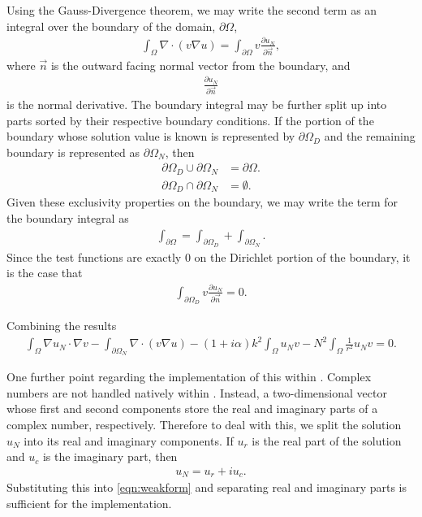 Using the Gauss-Divergence theorem, we may write the second term as an integral over the boundary of the domain, $\partial \Omega$,
\begin{align}
	\int_\Omega \nabla \cdot (v \nabla u ) = \int_{\partial\Omega} v \frac{\partial u_N}{\partial \vec{n}},
\end{align}
where $\vec{n}$ is the outward facing normal vector from the boundary, and
\begin{align}
	\frac{\partial u_N}{\partial \vec{n}} 
\end{align}
is the normal derivative.
The boundary integral may be further split up into parts sorted by their respective boundary conditions.
If the portion of the boundary whose solution value is known is represented by $\partial \Omega_D$ and the remaining boundary is represented as $\partial \Omega_N$, then
\begin{subequations}
\begin{align}
	\partial \Omega_D \cup \partial \Omega_N &= \partial \Omega. \\
	\partial \Omega_D \cap \partial \Omega_N &= \emptyset.
\end{align}
\end{subequations}
Given these exclusivity properties on the boundary, we may write the term for the boundary integral as
\begin{align}
	\int_{\partial\Omega} = \int_{\partial\Omega_D} + \int_{\partial\Omega_N}.
\end{align}
Since the test functions are exactly 0 on the Dirichlet portion of the boundary, it is the case that
\begin{align}
	\int_{\partial\Omega_D} v \frac{\partial u_N}{\partial \vec{n}} = 0.
\end{align}

Combining the results
\begin{align}
	\int_\Omega \nabla u_N \cdot \nabla v 
  - \int_{\partial\Omega_N} \nabla \cdot (v \nabla u ) 
  - (1+i\alpha)k^2 \int_\Omega u_N v 
  - N^2 \int_\Omega \frac{1}{r^2} u_N v = 0. \label{eqn:weakform}
\end{align}


One further point regarding the implementation of this within \oomph.
Complex numbers are not handled natively within \oomph.
Instead, a two-dimensional vector whose first and second components store the real and imaginary parts of a complex number, respectively.
Therefore to deal with this, we split the solution $u_N$ into its real and imaginary components.
If $u_r$ is the real part of the solution and $u_c$ is the imaginary part, then
\begin{align}
	u_N = u_r + i u_c.
\end{align}
Substituting this into \eqref{eqn:weakform} and separating real and imaginary parts is sufficient for the implementation.







